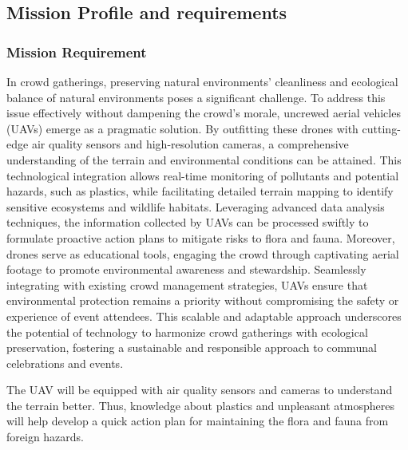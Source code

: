 \documentclass[12 pt]{article}
\begin{document}
\subsection{Mission Profile and requirements}

\subsubsection{Mission Requirement}
In crowd gatherings, preserving natural environments' cleanliness and ecological balance of natural environments poses a significant challenge. To address this issue effectively without dampening the crowd's morale, uncrewed aerial vehicles (UAVs) emerge as a pragmatic solution. By outfitting these drones with cutting-edge air quality sensors and high-resolution cameras, a comprehensive understanding of the terrain and environmental conditions can be attained. This technological integration allows real-time monitoring of pollutants and potential hazards, such as plastics, while facilitating detailed terrain mapping to identify sensitive ecosystems and wildlife habitats. Leveraging advanced data analysis techniques, the information collected by UAVs can be processed swiftly to formulate proactive action plans to mitigate risks to flora and fauna.
Moreover, drones serve as educational tools, engaging the crowd through captivating aerial footage to promote environmental awareness and stewardship. Seamlessly integrating with existing crowd management strategies, UAVs ensure that environmental protection remains a priority without compromising the safety or experience of event attendees. This scalable and adaptable approach underscores the potential of technology to harmonize crowd gatherings with ecological preservation, fostering a sustainable and responsible approach to communal celebrations and events. 

The UAV will be equipped with air quality sensors and cameras to understand the terrain better. Thus, knowledge about plastics and unpleasant atmospheres will help develop a quick action plan for maintaining the flora and fauna from foreign hazards.
\end{document}
